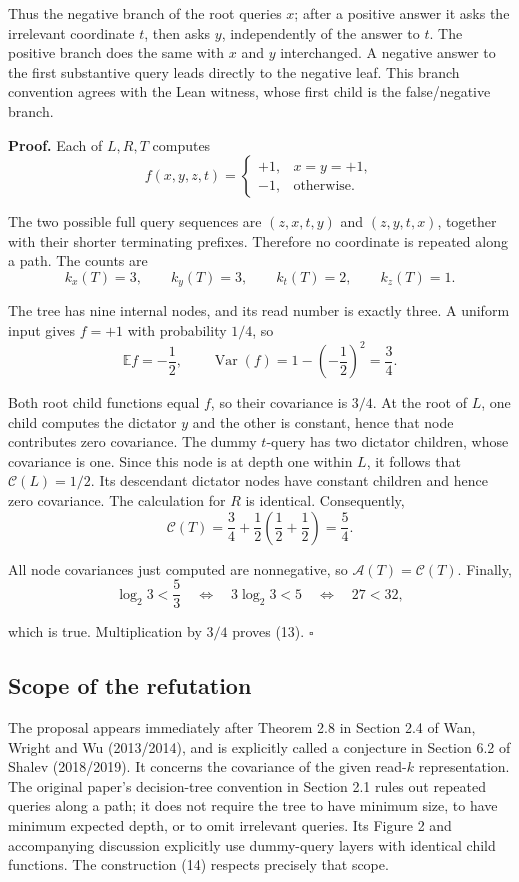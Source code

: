 \documentclass[
  american,
  11pt,
]{article}
\begin{document}
Thus the negative branch of the root queries \(x\); after a positive
answer it asks the irrelevant coordinate \(t\), then asks \(y\),
independently of the answer to \(t\). The positive branch does the same
with \(x\) and \(y\) interchanged. A negative answer to the first
substantive query leads directly to the negative leaf. This branch
convention agrees with the Lean witness, whose first child is the
false/negative branch.

\textbf{Proof.} Each of \(L,R,T\) computes \[
f(x,y,z,t)=
\begin{cases}
+1,&x=y=+1,\\
-1,&\text{otherwise}.
\end{cases}
\tag{15}
\]

The two possible full query sequences are \((z,x,t,y)\) and
\((z,y,t,x)\), together with their shorter terminating prefixes.
Therefore no coordinate is repeated along a path. The counts are \[
k_x(T)=3,\qquad k_y(T)=3,\qquad
k_t(T)=2,\qquad k_z(T)=1.
\tag{16}
\]

The tree has nine internal nodes, and its read number is exactly three.
A uniform input gives \(f=+1\) with probability \(1/4\), so \[
\mathbb E f=-\frac12,\qquad
\operatorname{Var}(f)=1-\left(-\frac12\right)^2=\frac34.
\tag{17}
\]

Both root child functions equal \(f\), so their covariance is \(3/4\).
At the root of \(L\), one child computes the dictator \(y\) and the
other is constant, hence that node contributes zero covariance. The
dummy \(t\)-query has two dictator children, whose covariance is one.
Since this node is at depth one within \(L\), it follows that
\(\mathcal C(L)=1/2\). Its descendant dictator nodes have constant
children and hence zero covariance. The calculation for \(R\) is
identical. Consequently, \[
\mathcal C(T)=\frac34+\frac12\left(\frac12+\frac12\right)=\frac54.
\tag{18}
\]

All node covariances just computed are nonnegative, so
\(\mathcal A(T)=\mathcal C(T)\). Finally, \[
\log_2 3<\frac53
\quad\Longleftrightarrow\quad
3\log_2 3<5
\quad\Longleftrightarrow\quad
27<32,
\]

which is true. Multiplication by \(3/4\) proves (13). \(\square\)

\subsection{Scope of the refutation}\label{scope-of-the-refutation}

The proposal appears immediately after Theorem 2.8 in Section 2.4 of
Wan, Wright and Wu (2013/2014), and is explicitly called a conjecture in
Section 6.2 of Shalev (2018/2019). It concerns the covariance of the
given read-\(k\) representation. The original paper's decision-tree
convention in Section 2.1 rules out repeated queries along a path; it
does not require the tree to have minimum size, to have minimum expected
depth, or to omit irrelevant queries. Its Figure 2 and accompanying
discussion explicitly use dummy-query layers with identical child
functions. The construction (14) respects precisely that scope.
\end{document}
